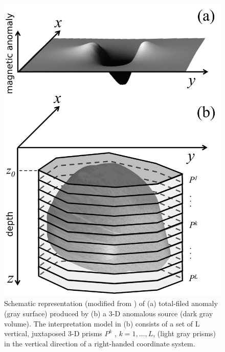 
\begin{figure}
    \centering
    \includegraphics[scale=1]{figures/observed_data.png}
    \caption{Schematic representation (modified from  \cite{oliveirajr-barbosa2013}) of (a) total-filed anomaly (gray surface) produced by (b) a 3-D anomalous source (dark gray volume). The interpretation model in (b) consists of a set of L vertical, juxtaposed 3-D prisms $P^k$ , $k = 1,\dots, L$, (light gray prisms) in the vertical direction of a right-handed coordinate system.}
    \label{fig:obs}
\end{figure}

